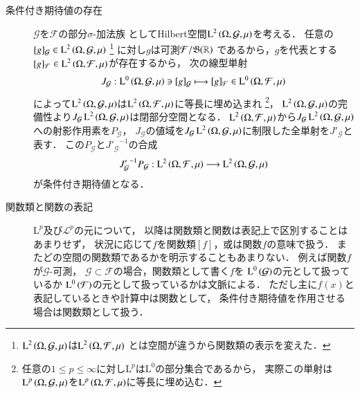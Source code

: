 \begin{description}
	\item[条件付き期待値の存在]
		$\mathcal{G}$を$\mathcal{F}$の部分$\sigma$-加法族
		としてHilbert空間$\operatorname{L}^{2} \left(\Omega, \mathcal{G},\mu\right)$を考える．
		任意の$[g]_{\mathcal{G}} \in \operatorname{L}^{2} \left(\Omega, \mathcal{G},\mu\right)$
		\footnote{
			$\operatorname{L}^{2} \left(\Omega, \mathcal{G},\mu\right)$は$\operatorname{L}^{2} \left(\Omega, \mathcal{F},\mu\right)$
			とは空間が違うから関数類の表示を変えた．
		}
		に対し$g$は可測$\mathcal{F}/\mathfrak{B}(\mathbb{R})$
		であるから，$g$を代表とする$[g]_{\mathcal{F}} \in \operatorname{L}^{2} \left(\Omega, \mathcal{F},\mu\right)$が存在するから，
		次の線型単射
		\begin{align}
			J_{\mathcal{G}}:\operatorname{L}^{0} \left(\Omega, \mathcal{G},\mu\right) \ni [g]_{\mathcal{G}} \longmapsto [g]_{\mathcal{F}} \in \operatorname{L}^{0} \left(\Omega, \mathcal{F},\mu\right)
			\label{eq:Lp_sp_embedding}
		\end{align}
		によって$\operatorname{L}^{2} \left(\Omega, \mathcal{G},\mu\right)$は$\operatorname{L}^{2} \left(\Omega, \mathcal{F},\mu\right)$に等長に埋め込まれ
		\footnote{
			任意の$1 \leq p \leq \infty$に対し$\mathrm{L}^{p}$は$\mathrm{L}^{0}$の部分集合であるから，
			実際この単射は$\operatorname{L}^{p} \left(\Omega, \mathcal{G},\mu\right)$を$\operatorname{L}^{p} \left(\Omega, \mathcal{F},\mu\right)$に等長に埋め込む．
		}，
		$\operatorname{L}^{2} \left(\Omega, \mathcal{G},\mu\right)$の完備性より$J_{\mathcal{G}} \operatorname{L}^{2} \left(\Omega, \mathcal{G},\mu\right)$は閉部分空間となる．
		$\operatorname{L}^{2} \left(\Omega, \mathcal{F},\mu\right)$から$J_{\mathcal{G}} \operatorname{L}^{2} \left(\Omega, \mathcal{G},\mu\right)$への射影作用素を$P_\mathcal{G}$，
		$J_{\mathcal{G}}$の値域を$J_{\mathcal{G}} \operatorname{L}^{2} \left(\Omega, \mathcal{G},\mu\right)$に制限した全単射を$J'_{\mathcal{G}}$と表す．
		この$P_{\mathcal{G}}$と${J'_{\mathcal{G}}}^{-1}$の合成
		\begin{align}
			{J'_{\mathcal{G}}}^{-1} P_{\mathcal{G}}:\operatorname{L}^{2} \left(\Omega, \mathcal{F},\mu\right) \longrightarrow \operatorname{L}^{2} \left(\Omega, \mathcal{G},\mu\right)
			\label{eq:composition_L2_conditional_expectation}
		\end{align}
		が条件付き期待値となる．
		
	\item[関数類と関数の表記]
		$\mathrm{L}^p$及び$\mathscr{L}^p$の元について，
		以降は関数類と関数は表記上で区別することはあまりせず，
		状況に応じて$f$を関数類$[f]$，或は関数$f$の意味で扱う．
		またどの空間の関数類であるかを明示することもあまりない．
		例えば関数$f$が$\mathcal{G}$-可測，
		$\mathcal{G} \subset \mathcal{F}$の場合，関数類として書く$f$を
		$\operatorname{L}^{0} \left(\mathcal{G}\right)$の元として扱っているか
		$\operatorname{L}^{0} \left(\mathcal{F}\right)$の元として扱っているかは文脈による．
		ただし主に$f(x)$と表記しているときや計算中は関数として，
		条件付き期待値を作用させる場合は関数類として扱う．
	\end{description}
	

